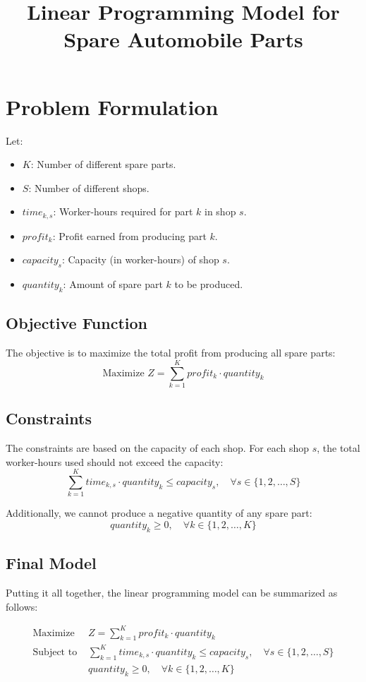 \documentclass{article}
\begin{document}
\title{Linear Programming Model for Spare Automobile Parts}
\author{}
\date{}
\maketitle

\section*{Problem Formulation}

Let:
\begin{itemize}
    \item \( K \): Number of different spare parts.
    \item \( S \): Number of different shops.
    \item \( time_{k,s} \): Worker-hours required for part \( k \) in shop \( s \).
    \item \( profit_{k} \): Profit earned from producing part \( k \).
    \item \( capacity_{s} \): Capacity (in worker-hours) of shop \( s \).
    \item \( quantity_{k} \): Amount of spare part \( k \) to be produced.
\end{itemize}

\subsection*{Objective Function}
The objective is to maximize the total profit from producing all spare parts:
\[
\text{Maximize } Z = \sum_{k=1}^{K} profit_{k} \cdot quantity_{k}
\]

\subsection*{Constraints}
The constraints are based on the capacity of each shop. For each shop \( s \), the total worker-hours used should not exceed the capacity:
\[
\sum_{k=1}^{K} time_{k,s} \cdot quantity_{k} \leq capacity_{s}, \quad \forall s \in \{1, 2, \ldots, S\}
\]

Additionally, we cannot produce a negative quantity of any spare part:
\[
quantity_{k} \geq 0, \quad \forall k \in \{1, 2, \ldots, K\}
\]

\subsection*{Final Model}
Putting it all together, the linear programming model can be summarized as follows:

\begin{align*}
\text{Maximize } & Z = \sum_{k=1}^{K} profit_{k} \cdot quantity_{k} \\
\text{Subject to } & \sum_{k=1}^{K} time_{k,s} \cdot quantity_{k} \leq capacity_{s}, \quad \forall s \in \{1, 2, \ldots, S\} \\
& quantity_{k} \geq 0, \quad \forall k \in \{1, 2, \ldots, K\}
\end{align*}
\end{document}
